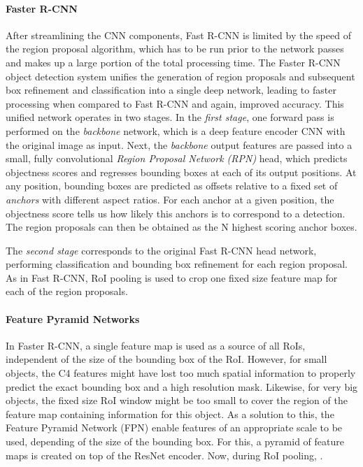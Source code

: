 \paragraph{Faster R-CNN}
After streamlining the CNN components, Fast R-CNN is limited by the speed of the region proposal
algorithm, which has to be run prior to the network passes and makes up a large portion of the total
processing time.
The Faster R-CNN object detection system \cite{FasterRCNN} unifies the generation of region proposals and subsequent box refinement and
classification into a single deep network, leading to faster processing when compared to Fast R-CNN
and again, improved accuracy.
This unified network operates in two stages.
In the \emph{first stage}, one forward pass is performed on the \emph{backbone} network,
which is a deep feature encoder CNN with the original image as input.
Next, the \emph{backbone} output features are passed into a small, fully convolutional \emph{Region Proposal Network (RPN)} head, which
predicts objectness scores and regresses bounding boxes at each of its output positions.
At any position, bounding boxes are predicted as offsets relative to a fixed set of \emph{anchors} with different
aspect ratios.
For each anchor at a given position, the objectness score tells us how likely this anchors is to correspond to a detection.
The region proposals can then be obtained as the N highest scoring anchor boxes.

The \emph{second stage} corresponds to the original Fast R-CNN head network, performing classification
and bounding box refinement for each region proposal. %
As in Fast R-CNN, RoI pooling is used to crop one fixed size feature map for each of the region proposals.

\paragraph{Feature Pyramid Networks}
In Faster R-CNN, a single feature map is used as a source of all RoIs, independent
of the size of the bounding box of the RoI.
However, for small objects, the C4  features
might have lost too much spatial information to properly predict the exact bounding
box and a high resolution mask. Likewise, for very big objects, the fixed size
RoI window might be too small to cover the region of the feature map containing
information for this object.
As a solution to this, the Feature Pyramid Network (FPN) \cite{FPN} enable features
of an appropriate scale to be used, depending of the size of the bounding box.
For this, a pyramid of feature maps is created on top of the ResNet \cite{ResNet}
encoder. 
Now, during RoI pooling,
.



